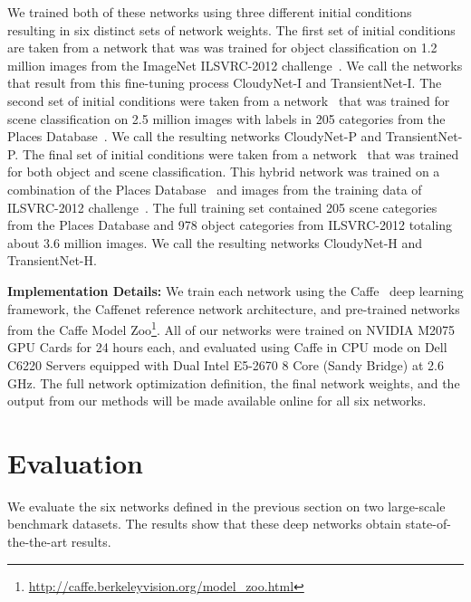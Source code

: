 \documentclass[10pt,twocolumn,letterpaper]{article}
\begin{document}
We trained both of these networks using three different initial conditions
resulting in six distinct sets of network weights. The first set of initial
conditions are taken from a network that was was trained for object
classification on 1.2 million images from the ImageNet ILSVRC-2012
challenge~\cite{ILSVRCarxiv14}.  We call the networks that result from this
fine-tuning process CloudyNet-I and TransientNet-I.  The second set of initial
conditions were taken from a network~\cite{zhou2014places} that was trained for
scene classification on 2.5 million images with labels in 205 categories from
the Places Database~\cite{zhou2014places}. We call the resulting networks
CloudyNet-P and TransientNet-P.  The final set of initial conditions were taken
from a network~\cite{zhou2014places} that was trained for both object and scene
classification.  This hybrid network was trained on a combination of the Places
Database~\cite{zhou2014places} and images from the training data of ILSVRC-2012
challenge~\cite{ILSVRCarxiv14}.  The full training set contained 205 scene
categories from the Places Database and 978 object categories from ILSVRC-2012
totaling about 3.6 million images.  We call the resulting networks CloudyNet-H
and TransientNet-H.

\textbf{Implementation Details:} We train each network using the
Caffe~\cite{caffe14} deep learning framework, the Caffenet reference network
architecture, and pre-trained networks from the Caffe Model
Zoo\footnote{\url{http://caffe.berkeleyvision.org/model_zoo.html}}.  All of our
networks were trained on NVIDIA M2075 GPU Cards for 24 hours each, and
evaluated using Caffe in CPU mode on Dell C6220 Servers equipped with Dual
Intel E5-2670 8 Core (Sandy Bridge) at 2.6 GHz.  The full network optimization
definition, the final network weights, and the output from our methods will be
made available online for all six networks.

\section{Evaluation}
\indent
We evaluate the six networks defined in the previous section on two large-scale
benchmark datasets. The results show that these deep networks obtain
state-of-the-the-art results. 
\end{document}

